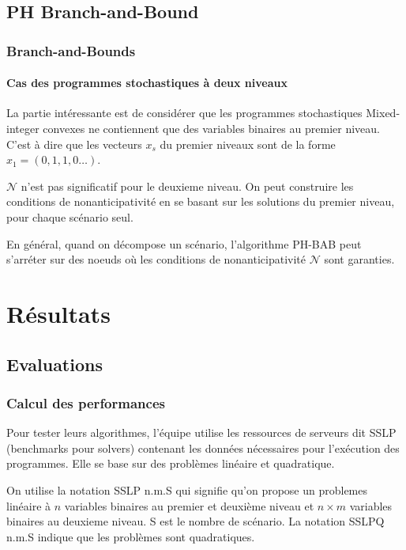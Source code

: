 \documentclass[10pt]{beamer}
\begin{document}
    \subsection{PH Branch-and-Bound}
    \begin{frame}
        \frametitle{Branch-and-Bounds}
        \framesubtitle{Cas des programmes stochastiques à deux niveaux}
    \end{frame}
    
    \begin{frame}
        La partie intéressante est de considérer que les programmes stochastiques Mixed-integer convexes ne contiennent que des variables binaires au premier niveau. C'est à dire que les vecteurs $x_s$ du premier niveaux sont de la forme $x_1 = (0, 1, 1, 0 \ldots)$.
    \end{frame}
    
    \begin{frame}
        $\mathcal{N}$ n'est pas significatif pour le deuxieme niveau. On peut construire les conditions de nonanticipativité en se basant sur les solutions du premier niveau, pour chaque scénario seul.
    \end{frame}
    
    \begin{frame}
        En général, quand on décompose un scénario, l'algorithme PH-BAB peut s'arréter sur des noeuds où les conditions de nonanticipativité $\mathcal{N}$ sont garanties. 
    \end{frame}
        
    \section{Résultats}
    \subsection{Evaluations}
    \begin{frame}
        \frametitle{Calcul des performances}
        Pour tester leurs algorithmes, l'équipe utilise les ressources de serveurs dit SSLP (benchmarks pour solvers) contenant les données nécessaires pour l'exécution des programmes. Elle se base sur des problèmes linéaire et quadratique.
        
        On utilise la notation SSLP n.m.S qui signifie qu'on propose un problemes linéaire à $n$ variables binaires au premier et deuxième niveau et $n \times m$ variables binaires au deuxieme niveau. S est le nombre de scénario.
        La notation SSLPQ n.m.S indique que les problèmes sont quadratiques.
    \end{frame}
    
\end{document}
